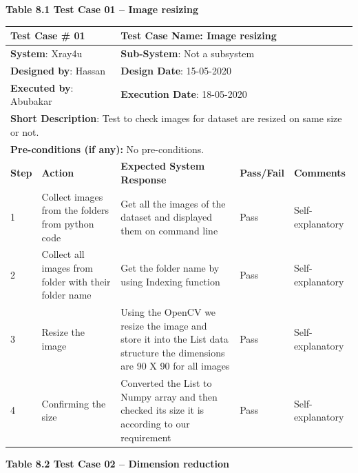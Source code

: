 \documentclass{article} %
\begin{document}
\noindent 

\noindent \eject 

\noindent \textbf{Table 8.1 Test Case 01 -- Image resizing}

\begin{tabular}{|p{0.3in}|p{1.0in}|p{1.6in}|p{0.6in}|p{0.7in}|} \hline 
\multicolumn{2}{|p{1in}|}{\textbf{Test Case} \# 01} & \multicolumn{2}{|p{2.2in}|}{\textbf{Test Case Name}: Image resizing} &  \\ \hline 
\multicolumn{2}{|p{1in}|}{\textbf{System}: Xray4u} & \multicolumn{2}{|p{2.2in}|}{\textbf{Sub-System}: Not a subsystem} &  \\ \hline 
\multicolumn{2}{|p{1in}|}{\textbf{Designed by}: Hassan} & \multicolumn{2}{|p{2.2in}|}{\textbf{Design Date}: 15-05-2020} &  \\ \hline 
\multicolumn{2}{|p{1in}|}{\textbf{Executed by}: Abubakar} & \multicolumn{2}{|p{2.2in}|}{\textbf{Execution Date}: 18-05-2020} &  \\ \hline 
\multicolumn{5}{|p{1in}|}{\textbf{Short Description}: Test to check images for dataset are resized on same size or not.} \\ \hline 
\multicolumn{4}{|p{1in}|}{\textbf{Pre-conditions (if any):} No pre-conditions.} &  \\ \hline 
\textbf{Step} & \textbf{Action} & \textbf{Expected System Response} & \textbf{Pass/Fail} & \textbf{Comments} \\ \hline 
1 & Collect images from the folders from python code & Get all the images of the dataset and displayed them on command line & Pass & Self-explanatory \\ \hline 
2 & Collect all images from folder with their folder name & Get the folder name by using Indexing function & Pass & Self-explanatory \\ \hline 
3 & Resize the image & Using the OpenCV we resize the image and store it into the List data structure the dimensions are 90 X 90 for all images & Pass & Self-explanatory \\ \hline 
4 & Confirming the size & Converted the List to Numpy array and then checked its size it is according to our requirement & Pass & Self-explanatory \\ \hline 
\end{tabular}



\noindent \eject 

\noindent \textbf{Table 8.2 Test Case 02 -- Dimension reduction}
\end{document}
